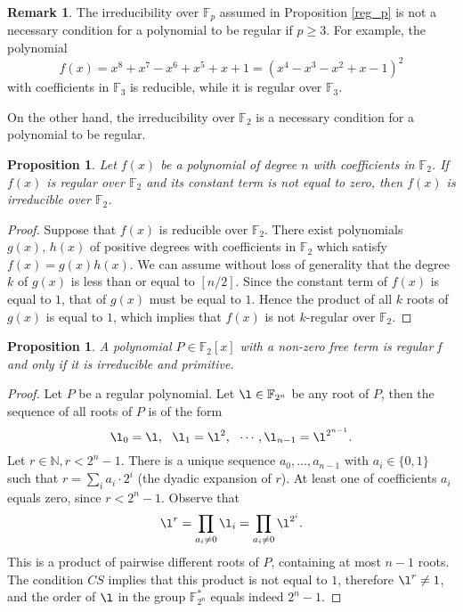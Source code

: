 \documentclass{amsart}
\theoremstyle{plain}
\newtheorem{prop}[thm]{Proposition}
\theoremstyle{definition}
\newtheorem{rem}[thm]{Remark}
\theoremstyle{remark}
\newcommand{\cb}{}
\begin{document}
\begin{rem}
The irreducibility over $\mathbb{F}_p$ assumed in Proposition \ref{reg_p} is not a necessary 
condition for a polynomial to be regular if $p\geq 3$. For example, the polynomial 
\[
f(x)=x^8+x^7-x^6+x^5+x+1=(x^4-x^3-x^2+x-1)^2
\]
with coefficients in $\mathbb{F}_3$ is reducible, while it is regular over $\mathbb{F}_3$. 
\end{rem}

On the other hand, 
the irreducibility over $\mathbb{F}_2$ is a necessary condition for a polynomial to be regular. 

\begin{prop}\label{irred}
Let $f(x)$ be a polynomial of degree $n$ with coefficients in $\mathbb{F}_2$. 
If $f(x)$ is regular over $\mathbb{F}_2$ and its constant term is not equal to zero, 
then $f(x)$ is irreducible over $\mathbb{F}_2$. 
\end{prop}

\begin{proof}
Suppose that $f(x)$ is reducible over $\mathbb{F}_2$. 
There exist polynomials $g(x),\, h(x)$ of positive degrees with coefficients in $\mathbb{F}_2$ 
which satisfy $f(x)=g(x)h(x)$. We can assume without loss of generality 
that the degree $k$ of $g(x)$ is less than or equal to $[n/2]$. 
Since the constant term of $f(x)$ is equal to $1$, that of $g(x)$ must be equal to $1$. 
Hence the product of all $k$ roots of $g(x)$ is equal to $1$, 
which implies that $f(x)$ is not $k$-regular over $\mathbb{F}_2$. 
\end{proof}


\newcommand{\ff}{\mathbb F}
\newcommand{\nn}{\mathbb N}
\newcommand{\zz}{\mathbb Z}

{\cb
\begin{prop}\label{t:cs-primitive}
A polynomial $P\in\ff_2[x]$ with a
non-zero free term
is regular
f and only if
it is irreducible and primitive.
\end{prop}
\begin{proof}
Let $P$ be a regular polynomial.
Let
$\l\in\ff_{2^n}$
be any root of $P$, then the sequence
of all roots of $P$ is of the form
$$\l_0=\l, \ \ \l_1=\l^{2},\ \  \cdots,
\l_{n-1}=\l^{2^{n-1}}.$$
Let $r\in\nn, r< 2^{n}-1$.
There is a unique sequence
$a_0,\ldots,a_{n-1}$ with $a_i\in\{0,1\}$
such that
$r=\sum_ia_i\cdot 2^i$
(the dyadic expansion of $r$).
At least one of coefficients $a_i$
equals zero, since $r< 2^n-1$.
Observe that
$$
\l^r=\prod_{a_i\not=0} \l_i=
\prod_{a_i\not=0} \l^{2^i}.
$$
This is a product of pairwise different roots of $P$,
containing at most
$n-1$ roots. The condition
$CS$ implies that this product is not equal to $1$,
therefore $\l^r\not=1$, and the order of $\l$ in the
group
$\ff_{2^n}^*$
equals indeed
$2^n -1$.
\end{proof}
}
\end{document}
